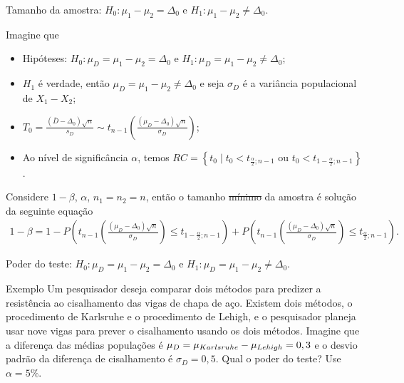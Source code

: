 \documentclass[9pt]{beamer}
\begin{document}
\begin{frame}{Tamanho da amostra: $H_0:\mu_1 - \mu_2 = \Delta_0$ e $H_1: \mu_1 - \mu_2 \neq \Delta_0$.}

\normalsize
Imagine que
\begin{itemize}
	\item Hipóteses: $H_0:\mu_D= \mu_1 - \mu_2 = \Delta_0$ e $H_1:\mu_D= \mu_1 -  \mu_2 \neq \Delta_0$;
	\item $H_1$ é verdade, então $\mu_D = \mu_1-\mu_2 \neq \Delta_0$ e seja $\sigma_D$ é a variância populacional de $X_1 - X_2$;
	\item $T_0 = \frac{(\bar{D} - \Delta_0)\sqrt{n}}{s_D} \sim t_{n-1}\left( \frac{(\mu_D - \Delta_0)\sqrt{n}}{\sigma_D} \right)$;
	\item Ao nível de significância $\alpha$, temos $RC = \left\{ t_0 \mid t_0 < t_{\frac{\alpha}{2};n-1} \mbox{ ou } t_0 < t_{1-\frac{\alpha}{2}; n-1} \right\}$.
\end{itemize}
\vfill

Considere $1-\beta$, $\alpha$, $n_1=n_2=n$, então o tamanho \sout{mínimo} da amostra é solução da seguinte equação
\scriptsize
\begin{align*}
1-\beta = 1 - P\left( t_{n-1}\left( \frac{(\mu_D - \Delta_0)\sqrt{n}}{\sigma_D} \right) \leq t_{1-\frac{\alpha}{2};n-1} \right) + P\left( t_{n-1}\left( \frac{(\mu_D - \Delta_0)\sqrt{n}}{\sigma_D} \right) \leq t_{\frac{\alpha}{2};n-1} \right).
\end{align*}

\normalsize
\end{frame}

\begin{frame}{Poder do teste: $H_0:\mu_D = \mu_1 - \mu_2 = \Delta_0$ e $H_1:\mu_D =  \mu_1 - \mu_2 \neq \Delta_0$.}

\large
\begin{block}{Exemplo}
	Um pesquisador deseja comparar dois métodos para predizer a resistência ao cisalhamento das vigas de chapa de aço. Existem dois métodos, o procedimento de Karlsruhe e o procedimento de Lehigh, e o pesquisador planeja usar nove vigas para prever o cisalhamento usando os dois métodos. Imagine que a diferença das médias populações é $\mu_D = \mu_{\tiny Karlsruhe} - \mu_{\tiny Lehigh} = 0,3$ e o desvio padrão da diferença de cisalhamento é $\sigma_D = 0,5$. Qual o poder do teste? Use $\alpha=5\%$. 
\end{block}	
\normalsize

\end{frame}
\end{document}
